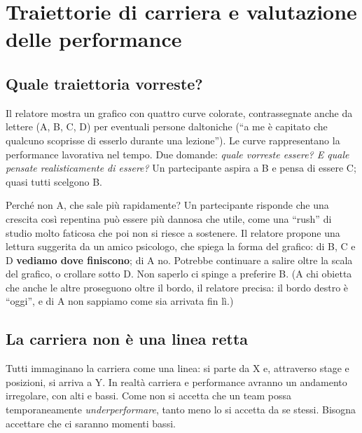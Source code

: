 \section{Traiettorie di carriera e valutazione delle performance}
\label{sec:z1-traiettorie}

\subsection{Quale traiettoria vorreste?}

Il relatore mostra un grafico con quattro curve colorate, contrassegnate
anche da lettere (A, B, C, D) per eventuali persone daltoniche (``a me è
capitato che qualcuno scoprisse di esserlo durante una lezione''). Le curve
rappresentano la performance lavorativa nel tempo. Due domande: \emph{quale
vorreste essere? E quale pensate realisticamente di essere?} Un partecipante
aspira a B e pensa di essere C; quasi tutti scelgono B.

Perché non A, che sale più rapidamente? Un partecipante risponde che una
crescita così repentina può essere più dannosa che utile, come una ``rush'' di
studio molto faticosa che poi non si riesce a sostenere. Il relatore propone
una lettura suggerita da un amico psicologo, che spiega la forma del grafico:
di B, C e D \textbf{vediamo dove finiscono}; di A no. Potrebbe continuare a
salire oltre la scala del grafico, o crollare sotto D. Non saperlo ci spinge a
preferire B. (A chi obietta che anche le altre proseguono oltre il bordo, il
relatore precisa: il bordo destro è ``oggi'', e di A non sappiamo come sia
arrivata fin lì.)

\subsection{La carriera non è una linea retta}

Tutti immaginano la carriera come una linea: si parte da X e, attraverso
stage e posizioni, si arriva a Y. In realtà carriera e performance avranno un
andamento irregolare, con alti e bassi. Come non si accetta che un team possa
temporaneamente \emph{underperformare}, tanto meno lo si accetta da se stessi.
Bisogna accettare che ci saranno momenti bassi.

